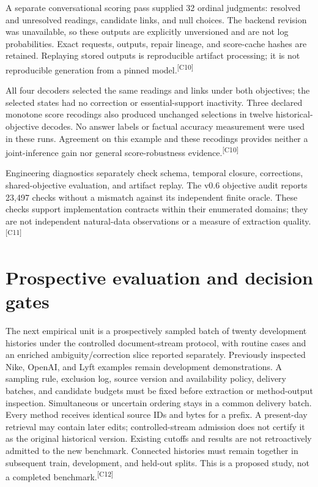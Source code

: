 \documentclass[10pt,letterpaper]{article}
\newcommand{\claim}[1]{\textsuperscript{\scriptsize[#1]}}
\begin{document}
A separate conversational scoring pass supplied 32 ordinal judgments:
resolved and unresolved readings, candidate links, and null choices. The backend
revision was unavailable, so these outputs are explicitly unversioned and are
not log probabilities. Exact requests, outputs, repair lineage, and score-cache
hashes are retained. Replaying stored outputs is reproducible artifact
processing; it is not reproducible generation from a pinned model.\claim{C10}

All four decoders selected the same readings and links under both objectives;
the selected states had no correction or essential-support inactivity. Three
declared monotone score recodings also produced unchanged selections in twelve
historical-objective decodes. No answer labels or factual accuracy measurement
were used in these runs. Agreement on this example and these recodings provides
neither a joint-inference gain nor general score-robustness evidence.\claim{C10}

Engineering diagnostics separately check schema, temporal closure, corrections,
shared-objective evaluation, and artifact replay. The v0.6 objective audit
reports 23,497 checks without a mismatch against its independent finite oracle.
These checks support implementation contracts within their enumerated domains;
they are not independent natural-data observations or a measure of extraction
quality.\claim{C11}

\section{Prospective evaluation and decision gates}
\label{sec:evaluation}
The next empirical unit is a prospectively sampled batch of twenty development
histories under the controlled document-stream protocol, with routine cases and
an enriched ambiguity/correction slice reported separately. Previously inspected
Nike, OpenAI, and Lyft examples remain
development demonstrations. A sampling rule, exclusion log, source version and
availability policy, delivery batches, and candidate budgets must be fixed before
extraction or method-output inspection. Simultaneous or uncertain ordering stays
in a common delivery batch. Every method receives identical source IDs and bytes
for a prefix. A present-day retrieval may contain later edits; controlled-stream
admission does not certify it as the original historical version. Existing
cutoffs and results are not retroactively admitted to the new benchmark.
Connected histories must remain together in subsequent
train, development, and held-out splits. This is a proposed study, not a
completed benchmark.\claim{C12}
\end{document}
